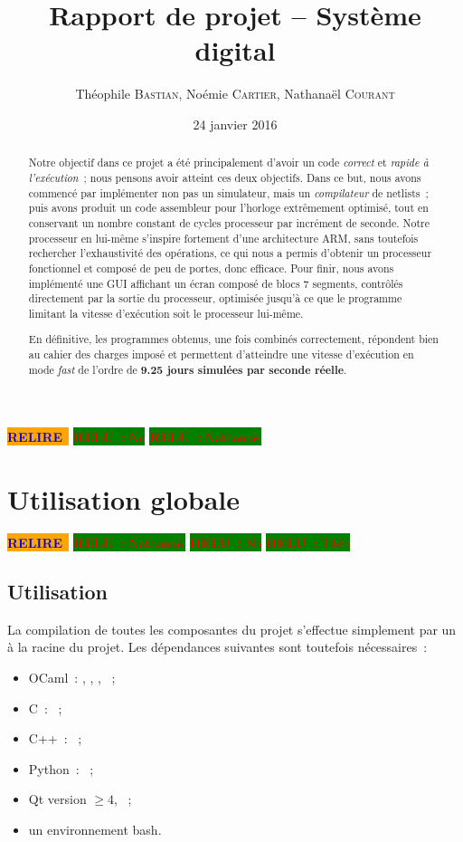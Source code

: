 \documentclass[11pt,a4paper]{article}
\author{Théophile \textsc{Bastian}, Noémie \textsc{Cartier}, Nathanaël \textsc{Courant}}
\title{Rapport de projet -- Système digital}
\date{24 janvier 2016} %
\newcommand{\relire}{\colorbox{orange}{\textcolor{blue}{\textbf{RELIRE}~}}}
\newcommand{\relu}[1]{\colorbox{green}{\textcolor{red}{\textbf{RELU~:} #1}}}
\begin{document}
\maketitle

\relire
\relu{No}
\relu{Nathanaël}
\begin{abstract}
Notre objectif dans ce projet a été principalement d'avoir un code \emph{correct} et \emph{rapide à l'exécution}~; nous pensons avoir atteint ces deux objectifs. Dans ce but, nous avons commencé par implémenter non pas un simulateur, mais un \emph{compilateur} de netlists~; puis avons produit un code assembleur pour l'horloge extrêmement optimisé, tout en conservant un nombre constant de cycles processeur par incrément de seconde. Notre processeur en lui-même s'inspire fortement d'une architecture ARM, sans toutefois rechercher l'exhaustivité des opérations, ce qui nous a permis d'obtenir un processeur fonctionnel et composé de peu de portes, donc efficace. Pour finir, nous avons implémenté une GUI affichant un écran composé de blocs 7 segments, contrôlés directement par la sortie du processeur, optimisée jusqu'à ce que le programme limitant la vitesse d'exécution soit le processeur lui-même.

En définitive, les programmes obtenus, une fois combinés correctement, répondent bien au cahier des charges imposé et permettent d'atteindre une vitesse d'exécution en mode \textit{fast} de l'ordre de \textbf{9.25 jours simulées par seconde réelle}.
\end{abstract}

\setcounter{tocdepth}{2} %
\tableofcontents
\pagebreak


\section{Utilisation globale}

\relire
\relu{Nathanaël}
\relu{No}
\relu{Théo}

\subsection{Utilisation}

La compilation de toutes les composantes du projet s'effectue simplement par un  à la racine du projet. Les dépendances suivantes sont toutefois nécessaires~:

\begin{itemize}
\item OCaml~: , , , ~;
\item C~: ~;
\item C++~: ~;
\item Python~: ~;
\item Qt version $\geq 4$, ~;
\item un environnement bash.
\end{itemize}
\end{document}
